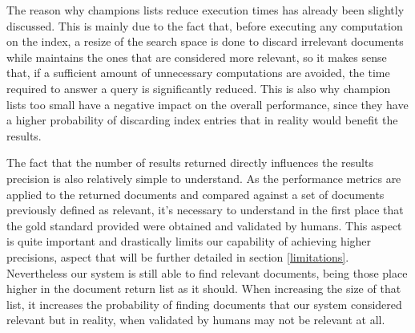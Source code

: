 \documentclass[12pt]{article}
\begin{document}
The reason why champions lists reduce execution times has already been slightly 
discussed. 
This is mainly due to the fact that, before executing any computation on the index,
a resize of the search space is done to discard irrelevant documents while maintains the ones that are considered more relevant, so
it makes sense that, if a sufficient amount of unnecessary computations are avoided,
the time required to answer a query is significantly reduced.
This is also why champion lists too small have a negative impact on the overall 
performance, since they have a higher probability of discarding index entries 
that in reality would benefit the results.

The fact that the number of results returned directly influences the results 
precision is also relatively simple to understand.
As the performance metrics are applied to the returned documents and compared against a set of documents previously defined as relevant, it's  necessary to understand in the first place that the gold standard provided were obtained and validated by humans. This aspect is quite important and drastically limits our capability of achieving higher precisions, aspect that will be further detailed in section \ref{limitations}. Nevertheless our system is still able to find relevant documents, being those place higher in the document return list as it should. When increasing the size of that list, it increases the probability of finding documents that our system considered relevant but in reality, when validated by humans may not be relevant at all.
\end{document}
